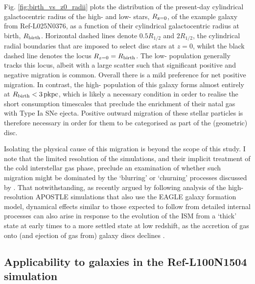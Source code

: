 Fig. \ref{fig:birth_vs_z0_radii} plots the distribution of the present-day cylindrical galactocentric radius of the high- and low-\afe{} stars, $R_{\rm z=0}$, of the example galaxy from Ref-L025N0376, as a function of their cylindrical galactocentric radius at birth, $R_{\rm birth}$. Horizontal dashed lines denote $0.5R_{1/2}$ and $2R_{1/2}$, the cylindrical radial boundaries that are imposed to select disc stars at $z=0$, whilst the black dashed line denotes the locus $R_{z=0} = R_{\rm birth}$. The low-\afe{} population generally tracks this locus, albeit with a large scatter such that significant positive and negative migration is common. Overall there is a mild preference for net positive migration. In contrast, the high-\afe{} population of this galaxy forms almost entirely at $R_{\rm birth} < 3\,{\rm pkpc}$, which is likely a necessary condition in order to realise the short consumption timescales that preclude the enrichment of their natal gas with Type Ia SNe ejecta. Positive outward migration of these stellar particles is therefore necessary in order for them to be categorised as part of the (geometric) disc. 

Isolating the physical cause of this migration is beyond the scope of this study. I note that the limited resolution of the simulations, and their implicit treatment of the cold interstellar gas phase, preclude an examination of whether such migration might be dominated by the `blurring' or `churning' processes discussed by \citet{2009MNRAS.396..203S}. That notwithstanding, as recently argued by \citet{2017arXiv170901040N} following analysis of the high-resolution APOSTLE simulations \citep{2016MNRAS.457.1931S} that also use the EAGLE galaxy formation model, dynamical effects similar to those expected to follow from detailed internal processes can also arise in response to the evolution of the ISM from a `thick' state at early times to a more settled state at low redshift, as the accretion of gas onto (and ejection of gas from) galaxy discs declines \citep[see also][]{2004ApJ...612..894B,2012MNRAS.426..690B,2013ApJ...773...43B,2016arXiv160804133M}.



\subsection{Applicability to galaxies in the Ref-L100N1504 simulation}
\label{sec:broader_applicability}


